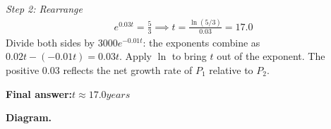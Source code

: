 \documentclass[11pt]{article}
\begin{document}
\textit{Step 2: Rearrange}
\[\begin{gathered}
e^{0.03t} = \frac{5}{3} \implies t = \frac{\ln(5/3)}{0.03} = 17.0
\end{gathered}\]
Divide both sides by \( 3000e^{-0.01t} \): the exponents combine as \( 0.02t - (-0.01t) = 0.03t \). Apply \( \ln \) to bring \( t \) out of the exponent. The positive \( 0.03 \) reflects the net growth rate of \( P_1 \) relative to \( P_2 \).

\begin{answerbox}
\textbf{Final answer:}\quad \(\displaystyle t \approx 17.0 years\)
\end{answerbox}
\textbf{Diagram.}

\begin{center}
\end{center}
\end{document}
